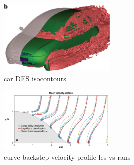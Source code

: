 \documentclass[journal]{new-aiaa}
\begin{document}
\begin{figure}[H]
\begin{center}
\includegraphics[width=0.5\textwidth]{Images/logan/spalart2009detachededdy_carDES.pdf}
\caption{ car DES isocontours \cite{mendonca2002towards} }
\label{fig:cardes}
\end{center}
\end{figure}











\begin{figure}[H]
\begin{center}
\includegraphics[width=0.5\textwidth]{Images/logan/durbin2018some_BackstepLESvsRANS.pdf}
\caption{curve backstep velocity profile les vs rans \cite{durbin2018some}}
\label{fig:lesvsransbackstep}
\end{center}
\end{figure}
\end{document}

